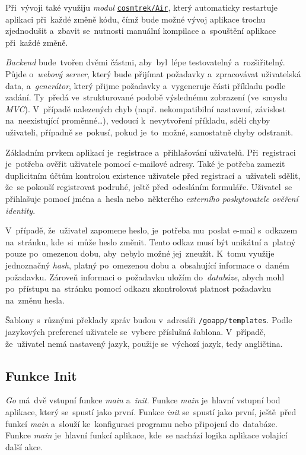\documentclass[11pt,a4paper]{report}
\begin{document}
            Při~vývoji také využiju \emph{modul} \href{https://github.com/cosmtrek/air}{\texttt{cosmtrek/Air}}, který automaticky restartuje aplikaci při~každé změně kódu, čímž bude možné vývoj aplikace trochu zjednodušit a~zbavit se~nutnosti manuální kompilace a~spouštění aplikace při~každé změně.

            \emph{Backend} bude~tvořen dvěmi částmi, aby~byl~lépe testovatelný a~rozšiřitelný. Půjde o~\emph{webový server}, který bude přijímat požadavky a~zpracovávat uživatelská data, a~\emph{generátor}, který přijme požadavky a~vygeneruje části příkladu podle zadání. Ty~předá ve~strukturované podobě výslednému zobrazení (ve~smyslu \emph{MVC}). V~případě nalezených chyb (např. nekompatibilní nastavení, závislost na~neexistující proměnné\dots), vedoucí k~nevytvoření příkladu, sdělí chyby uživateli, případně se~pokusí, pokud je~to~možné, samostatně chyby odstranit.

            Základním prvkem aplikací je~registrace a~přihlašování uživatelů. Při~registraci je~potřeba ověřit uživatele pomocí e-mailové adresy. Také je potřeba zamezit duplicitním účtům kontrolou existence uživatele před registrací a~uživateli sdělit, že~se pokouší registrovat podruhé, ještě před~odesláním formuláře. Uživatel~se přihlašuje pomocí jména a~hesla nebo~některého \emph{externího poskytovatele ověření identity}.
            
            V~případě, že~uživatel zapomene heslo, je~potřeba mu~poslat e-mail s~odkazem na~stránku, kde~si~může heslo změnit. Tento odkaz musí být unikátní a~platný pouze po~omezenou dobu, aby~nebylo možné jej~zneužít. K~tomu využije jednoznačný \emph{hash}, platný po~omezenou dobu a~obsahující informace o~daném požadavku. Zároveň informaci o~požadavku uložím do~\emph{databáze}, abych mohl po~přístupu na~stránku pomocí odkazu zkontrolovat platnost požadavku na~změnu hesla.

            Šablony s~různými překlady zpráv budou v~adresáři \texttt{/goapp/templates}. Podle jazykových preferencí uživatele se~vybere příslušná šablona. V~případě, že~uživatel nemá nastavený jazyk, použije se~výchozí jazyk, tedy angličtina.
            
        \subsection{Funkce Init}
            \emph{Go} má~dvě vstupní funkce \emph{main} a~\emph{init}. Funkce \emph{main} je~hlavní vstupní bod aplikace, který se~spustí jako první. Funkce \emph{init} se~spustí jako první, ještě~před funkcí \emph{main} a~slouží ke~konfiguraci programu nebo připojení do~databáze. Funkce \emph{main} je~hlavní funkcí aplikace, kde~se nachází logika aplikace volající další akce.
\end{document}
